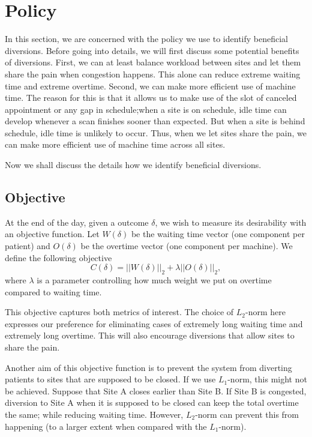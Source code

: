 \section{Policy}

In this section, we are concerned with the policy we use to identify
beneficial diversions. Before going into details, we will first discuss
some potential benefits of diversions. First, we can at least
balance workload between sites and let them share the pain when congestion
happens. This alone can reduce extreme waiting time and extreme overtime.
Second, we can make more efficient use of machine time. The reason for this
is that it allows us to make use of the slot of canceled appointment
or any gap in schedule;when a site is on schedule, idle
time can develop whenever a scan finishes
sooner than expected. But when a site is behind schedule, idle time is
unlikely to occur. Thus, when we let sites share the pain, we can make
more efficient use of machine time across all sites.

Now we shall discuss the details how we identify beneficial diversions.

\subsection{Objective}

At the end of the day, given a outcome $\delta$, we wish to measure
its desirability with an objective function. Let $W(\delta)$ be the
waiting time vector (one component per patient) and $O(\delta)$ be the overtime
vector (one component per machine). We define the following objective
\[  C(\delta) = ||W(\delta)||_2 + \lambda ||O(\delta)||_2, \]
where $\lambda$ is a parameter controlling how much weight
we put on overtime compared to waiting time.

This objective captures both metrics of interest. The choice of
$L_2$-norm here expresses our preference for eliminating cases of
extremely long waiting time and extremely long overtime. This will
also encourage diversions that allow sites to share the pain.

Another aim of this objective function is to prevent the system from
diverting patients to sites that are supposed to be closed.
If we use $L_1$-norm, this might not be achieved. Suppose that Site A
closes earlier than Site B. If Site B is congested, diversion
to Site A when it is supposed to be closed can keep the total
overtime the same; while reducing waiting time. However,
$L_2$-norm can prevent this from happening (to a larger extent
when compared with the $L_1$-norm).

